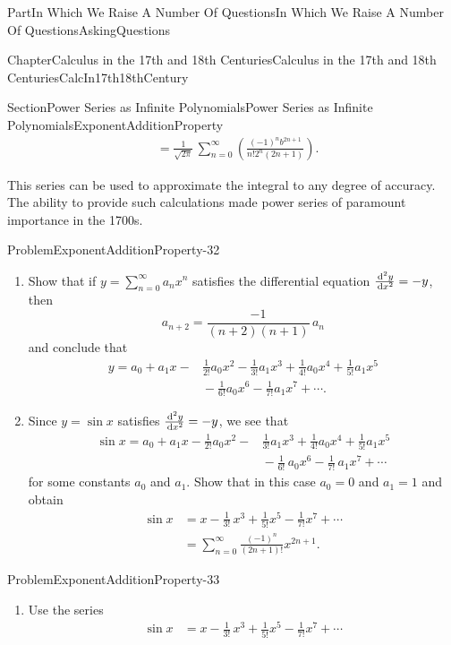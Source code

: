 \documentclass[oneside,10pt,]{book}
\numberwithin{equation}{part}
\newcommand{\dx}[1]{\,{\rm d}#1}
\newcommand{\amp}{&}
\begin{document}
\begin{partptx}{Part}{In Which We Raise A Number Of Questions}{}{In Which We Raise A Number Of Questions}{}{}{AskingQuestions}
\begin{chapterptx}{Chapter}{Calculus in the 17th and 18th Centuries}{}{Calculus in the 17th and 18th Centuries}{}{}{CalcIn17th18thCentury}
\begin{sectionptx}{Section}{Power Series as Infinite Polynomials}{}{Power Series as Infinite Polynomials}{}{}{ExponentAdditionProperty}
\begin{align*}
\amp =\frac{1}{\sqrt{2\pi}}\,\sum_{n=0}^\infty\left(\frac{\left(-1\right)^nb^{2n+1}}{n!2^n\left(2n+1\right)}\right)\text{.}
\end{align*}
%
\par
This series can be used to approximate the integral to any degree of accuracy.  The ability to provide such calculations made power series of paramount importance in the 1700s.%
\begin{problem}{Problem}{}{ExponentAdditionProperty-32}%
\begin{enumerate}[font=\bfseries,label=(\alph*),ref=\alph*]%
\item{}Show that if \(y=\sum_{n=0}^\infty a_nx^n\) satisfies the differential equation \(\frac{\dx^2y}{\dx{ x}^2}=-y\), then%
\begin{equation*}
a_{n+2}=\frac{-1}{\left(n+2\right)\left(n+1\right)}\,a_n
\end{equation*}
and conclude that%
\begin{align*}
y=a_0+a_1x-\amp{}\frac{1}{2!}a_0x^2-\frac{1}{3!}a_1x^3+\frac{1}{4!}a_0x^4+\frac{1}{5!}a_1x^5\\
\amp{}-\frac{1}{6!}a_0x^6-\frac{1}{7!}a_1x^7+\cdots.
\end{align*}
%
\item{}Since \(y=\sin x\) satisfies \(\frac{\dx^2y}{\dx{
x}^2}=-y\), we see that%
\begin{align*}
\sin x=a_0+a_1x-\frac{1}{2!}a_0x^2-\amp{}\frac{1}{3!}a_1x^3+\frac{1}{4!}a_0x^4+\frac{1}{5!}a_1x^5\\
\amp{}-\frac{1}{6!}\,a_0x^6-\frac{1}{7!}\,a_1x^7+\cdots
\end{align*}
for some constants \(a_0\) and \(a_1\).  Show that in this case \(a_0=0\) and \(a_1=1\) and obtain%
\begin{align*}
\sin
x\amp{}=x-\frac{1}{3!}\,x^3+\frac{1}{5!}x^5-\frac{1}{7!}x^7+\cdots\\
\amp{}=\sum_{n=0}^\infty\frac{\left(-1\right)^n}{\left(2n+1\right)!}x^{2n+1}.
\end{align*}
%
\end{enumerate}%
\end{problem}
\begin{problem}{Problem}{}{ExponentAdditionProperty-33}%
\begin{enumerate}[font=\bfseries,label=(\alph*),ref=\alph*]%
\item{}Use the series%
\begin{align*}
\sin x\amp{}=x-\frac{1}{3!}\,x^3+\frac{1}{5!}x^5-\frac{1}{7!}x^7+\cdots\\

\end{align*}
\end{enumerate}
\end{problem}
\end{sectionptx}
\end{chapterptx}
\end{partptx}
\end{document}
